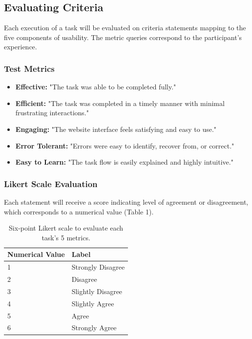 \documentclass[12pt, letterpaper]{article}
\begin{document}
\subsection{Evaluating Criteria}
Each execution of a task will be evaluated on criteria statements mapping to the five components of usability. The metric queries correspond to the participant's experience.

\subsubsection{Test Metrics}
\begin{itemize}[noitemsep]
    \item \textbf{Effective:} "The task was able to be completed fully."
    \item \textbf{Efficient:} "The task was completed in a timely manner with minimal frustrating interactions."
    \item \textbf{Engaging:} "The website interface feels satisfying and easy to use."
    \item \textbf{Error Tolerant:} "Errors were easy to identify, recover from, or correct."
    \item \textbf{Easy to Learn:} "The task flow is easily explained and highly intuitive."
\end{itemize}

\subsubsection{Likert Scale Evaluation}
Each statement will receive a score indicating level of agreement or disagreement, which corresponds to a numerical value (Table 1).

\begin{table}[h]
    \centering
    \caption{Six-point Likert scale to evaluate each task's 5 metrics.}
    \vspace{0.2cm}
    \begin{tabular}{@{}ll@{}}
        \toprule
        \textbf{Numerical Value} & \textbf{Label} \\
        \midrule
        1 & Strongly Disagree \\
        2 & Disagree \\
        3 & Slightly Disagree \\
        4 & Slightly Agree \\
        5 & Agree \\
        6 & Strongly Agree \\
        \bottomrule
    \end{tabular}
\end{table}
\end{document}
